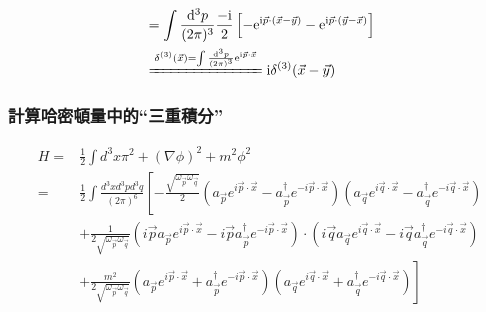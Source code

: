 \documentclass{article}
\begin{document}
$$\begin{aligned}
                                        & =\int\frac{\mathrm{d}^3p}{(2\pi)^3}\frac{-\mathrm{i}}{2}\left[-\mathrm{e}^{\mathrm{i}\vec{p}\cdot(\vec{x}-\vec{y})}-\mathrm{e}^{\mathrm{i}\vec{p}\cdot(\vec{y}-\vec{x})}\right]                                                                                                                                                                                                                                                                                                                                                                                                     \\
                                        & \xlongequal{\delta^{(3)}(\vec{x})= \int\frac{\mathrm{d}^3p}{(2\pi)^3}\mathrm{e}^{\mathrm{i}\vec{p}\cdot\vec{x}}} \mathrm{i}\delta^{(3)}(\vec{x}-\vec{y})
  \end{aligned}$$

\subsubsection{計算哈密頓量中的“三重積分”}

$$\begin{aligned}
    H= & \frac{1}{2} \int d^{3} x \pi^{2}+(\nabla \phi)^{2}+m^{2} \phi^{2}                                                                                                                                                                                                                                                                          \\
    =  & \frac{1}{2} \int \frac{d^{3} x d^{3} p d^{3} q}{(2 \pi)^{6}}\left[-\frac{\sqrt{\omega_{\vec{p}} \omega_{\vec{q}}}}{2}\left(a_{\vec{p}} e^{i \vec{p} \cdot \vec{x}}-a_{\vec{p}}^{\dagger} e^{-i \vec{p} \cdot \vec{x}}\right)\left(a_{\vec{q}} e^{i \vec{q} \cdot \vec{x}}-a_{\vec{q}}^{\dagger} e^{-i \vec{q} \cdot \vec{x}}\right)\right. \\
       & +\frac{1}{2 \sqrt{\omega_{\vec{p}} \omega_{\vec{q}}}}\left(i \vec{p} a_{\vec{p}} e^{i \vec{p} \cdot \vec{x}}-i \vec{p} a_{\vec{p}}^{\dagger} e^{-i \vec{p} \cdot \vec{x}}\right) \cdot\left(i \vec{q} a_{\vec{q}} e^{i \vec{q} \cdot \vec{x}}-i \vec{q} a_{\vec{q}}^{\dagger} e^{-i \vec{q} \cdot \vec{x}}\right)                          \\
       & \left.+\frac{m^{2}}{2 \sqrt{\omega_{\vec{p}} \omega_{\vec{q}}}}\left(a_{\vec{p}} e^{i \vec{p} \cdot \vec{x}}+a_{\vec{p}}^{\dagger} e^{-i \vec{p} \cdot \vec{x}}\right)\left(a_{\vec{q}} e^{i \vec{q} \cdot \vec{x}}+a_{\vec{q}}^{\dagger} e^{-i \vec{q} \cdot \vec{x}}\right)\right]
  \end{aligned}$$
\end{document}
